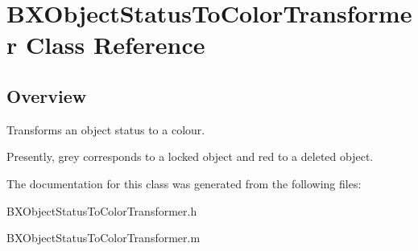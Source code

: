\hypertarget{interface_b_x_object_status_to_color_transformer}{}\section{B\+X\+Object\+Status\+To\+Color\+Transformer Class Reference}
\label{interface_b_x_object_status_to_color_transformer}


\subsection{Overview}
Transforms an object status to a colour. 

Presently, grey corresponds to a locked object and red to a deleted object. 

The documentation for this class was generated from the following files\+:\begin{DoxyCompactItemize}
\item 
B\+X\+Object\+Status\+To\+Color\+Transformer.\+h\item 
B\+X\+Object\+Status\+To\+Color\+Transformer.\+m\end{DoxyCompactItemize}
